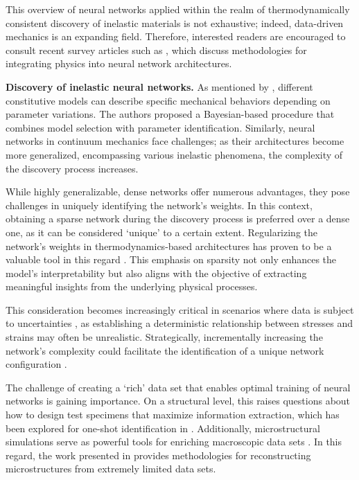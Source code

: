 This overview of neural networks applied within the realm of thermodynamically consistent discovery of inelastic materials is not exhaustive; indeed, data-driven mechanics is an expanding field. Therefore, interested readers are encouraged to consult recent survey articles such as \cite{linden2023,watson2024arxiv,Fuhg2024}, which discuss methodologies for integrating physics into neural network architectures.\newline

\textbf{Discovery of inelastic neural networks.} As mentioned by \cite{Battalgazy2025}, different constitutive models can describe specific mechanical behaviors depending on parameter variations. 
The authors proposed a Bayesian-based procedure that combines model selection with parameter identification. 
Similarly, neural networks in continuum mechanics face challenges; as their architectures become more generalized, encompassing various inelastic phenomena, the complexity of the discovery process increases.

While highly generalizable, dense networks offer numerous advantages, they pose challenges in uniquely identifying the network's weights.
In this context, obtaining a sparse network during the discovery process is preferred over a dense one, as it can be considered `unique' to a certain extent. 
Regularizing the network's weights in thermodynamics-based architectures has proven to be a valuable tool in this regard \cite{mcculloch2024}.
This emphasis on sparsity not only enhances the model’s interpretability but also aligns with the objective of extracting meaningful insights from the underlying physical processes.

This consideration becomes increasingly critical in scenarios where data is subject to uncertainties \cite{LINKA2025117517}, as establishing a deterministic relationship between stresses and strains may often be unrealistic. 
Strategically, incrementally increasing the network's complexity could facilitate the identification of a unique network configuration \cite{linka2024} .

The challenge of creating a `rich' data set that enables optimal training of neural networks is gaining importance. 
On a structural level, this raises questions about how to design test specimens that maximize information extraction, which has been explored for one-shot identification in \cite{ghouli2025topologyoptimisationframeworkdesign}. 
Additionally, microstructural simulations serve as powerful tools for enriching macroscopic data sets \cite{PRUME2025117525}. 
In this regard, the work presented in \cite{ZHANG2024112661} provides methodologies for reconstructing microstructures from extremely limited data sets.

